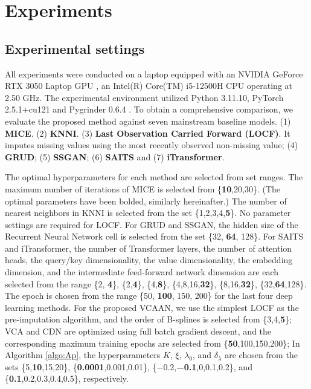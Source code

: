 \documentclass[3p,11pt,authoryear]{elsarticle}
\begin{document}
\section{Experiments}\label{sec:Experiments}
\subsection{Experimental settings}\label{subsec:Experimental setup}
All experiments were conducted on a laptop equipped with an NVIDIA GeForce RTX 3050 Laptop GPU , an Intel(R) Core(TM) i5-12500H CPU operating at 2.50 GHz. The experimental environment utilized Python 3.11.10, PyTorch 2.5.1+cu121 and  Pygrinder 0.6.4 \citep{du2023pypots}. To obtain a comprehensive comparison, we evaluate the proposed method against seven mainstream baseline models. 
(1) \textbf{MICE}\citep{van2000multivariate}. 
(2) \textbf{KNNI}\citep{cover1967nearest}. 
(3) \textbf{Last Observation Carried Forward (LOCF)}. It imputes missing values using the most recently observed non-missing value; 
(4) \textbf{GRUD}\citep{che2018grud}; 
(5) \textbf{SSGAN}\citep{miao2021ssgan}; 
(6) \textbf{SAITS}\citep{du2023saits} and 
(7) \textbf{iTransformer}\citep{liu2023itransformer}. 

The optimal hyperparameters for each method are selected from set ranges. The maximum number of iterations of MICE is selected from \{\textbf{10},20,30\}. (The optimal parameters have been bolded, similarly hereinafter.) The number of nearest neighbors in KNNI is selected from the set \{1,2,3,4,\textbf{5}\}. No parameter settings are required for LOCF. For GRUD and SSGAN, the hidden size of the Recurrent Neural Network cell is selected from the set \{32, \textbf{64}, 128\}. For SAITS and iTransformer, the number of Transformer layers, the number of attention heads, the query/key dimensionality, the value dimensionality, the embedding dimension, and the intermediate feed-forward network dimension are each selected from the range \{2, \textbf{4}\}, \{2,\textbf{4}\}, \{4,\textbf{8}\}, \{4,8,16,\textbf{32}\}, \{8,16,\textbf{32}\}, \{32,\textbf{64},128\}. The epoch is chosen from the range \{50, \textbf{100}, 150, 200\} for the last four deep learning methods. 
For the proposed VCAAN, we use the simplest LOCF as the pre-imputation algorithm, and the order of B-splines is selected from \{3,4,\textbf{5}\}; VCA and CDN are optimized using full batch gradient descent, and the corresponding maximum training epochs are selected from \{\textbf{50},100,150,200\}; In Algorithm \ref{algo:Ap}, the hyperparameters $K$, $\xi$, $\lambda_0$, and $\delta_\lambda$ are chosen from the sets \{5,\textbf{10},15,20\}, \{\textbf{0.0001},0.001,0.01\}, \{−0.2,\textbf{−0.1},0,0.1,0.2\}, and \{\textbf{0.1},0.2,0.3,0.4,0.5\}, respectively. 
\end{document}
